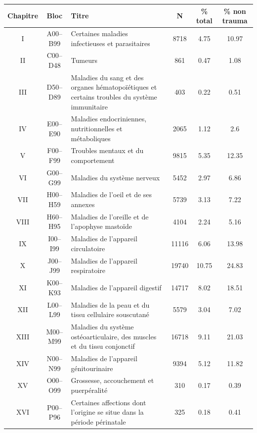 \documentclass[12pt,english,french,twoside]{report}\usepackage[]{graphicx}\usepackage[]{color}
\begin{document}
\begin{longtable}{|c|c|m{4cm}|c|c|c|}
 \hline
 Chapitre & Bloc & Titre & N & \% total  & \% non trauma \\
 \hline
 
I & A00–B99 & Certaines maladies infectieuses et parasitaires & 8718 & 4.75 & 10.97 \\
 II&C00–D48&Tumeurs&861&0.47&1.08\\
 
III&D50–D89&Maladies du sang et des organes hématopoïétiques et certains troubles du système immunitaire&403&0.22&0.51\\

IV&E00–E90&Maladies endocriniennes, nutritionnelles et métaboliques&2065&1.12&2.6\\

V&F00–F99&Troubles mentaux et du comportement&9815&5.35&12.35\\

VI&G00–G99&Maladies du système nerveux&5452&2.97&6.86\\

VII & H00–H59 & Maladies de l'oeil et de ses annexes & 5739 & 3.13&7.22\\

VIII&H60–H95&Maladies de l'oreille et de l'apophyse mastoïde&4104&2.24&5.16\\

IX&I00–I99&Maladies de l'appareil circulatoire&11116&6.06&13.98\\

X&J00–J99&Maladies de l'appareil respiratoire&19740&10.75&24.83\\

XI&K00–K93&Maladies de l'appareil digestif&14717&8.02&18.51\\

XII&L00–L99&Maladies de la peau et du tissu cellulaire souscutané&5579&3.04&7.02\\

XIII&M00–M99&Maladies du système ostéoarticulaire, des muscles et du tissu conjonctif&16718&9.11&21.03\\

XIV&N00–N99&Maladies de l'appareil génitourinaire&9394&5.12&11.82\\

XV&O00–O99&Grossesse, accouchement et puerpéralité&310&0.17&0.39\\

XVI&P00–P96&Certaines affections dont l'origine se situe dans la période périnatale&325&0.18&0.41\\


\end{longtable}
\end{document}
